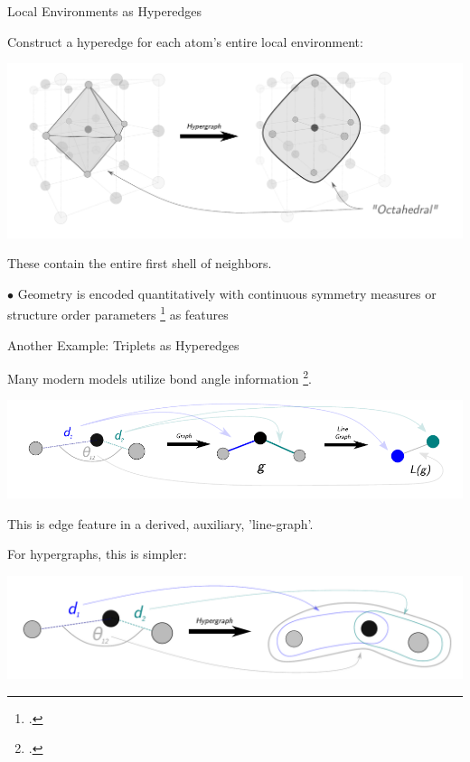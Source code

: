\documentclass[11pt]{beamer}
\begin{document}
\begin{frame}{Local Environments as Hyperedges}
\small

Construct a hyperedge for each atom's entire local environment:

\medskip

\hspace{1cm}\includegraphics[scale=0.27]{motif_level_ex.pdf}

\medskip\pause

These contain the entire first shell of neighbors. \pause 

\medskip

$\bullet$ Geometry is encoded quantitatively with continuous symmetry measures or structure order parameters \footcite{orderparam1} as features 
\end{frame}

\begin{frame}{{\small Another Example:} Triplets as Hyperedges}


\begin{center}
Many modern models utilize bond angle information \footcite{alignn, m3gnet}. 

\medskip

\includegraphics[scale=0.55]{line_graph_ex.pdf}


This is edge feature in a derived, auxiliary, 'line-graph'.

\medskip\pause


For hypergraphs, this is simpler:\pause

\includegraphics[scale=0.3]{triplet_ex.pdf}


\end{center}

\end{frame}
\end{document}
